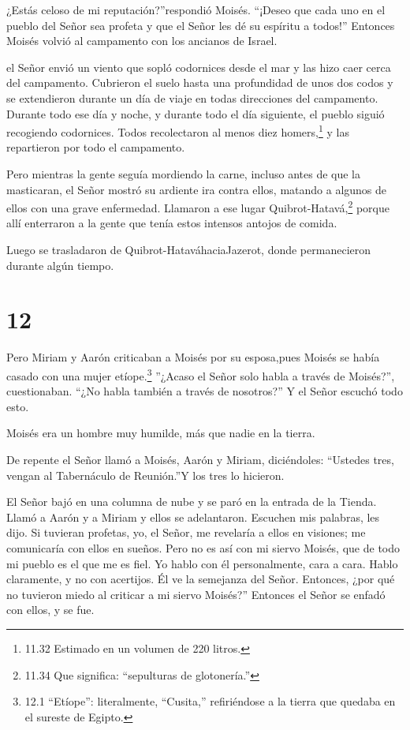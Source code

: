  ¿Estás celoso de mi reputación?''respondió Moisés.
``¡Deseo que cada uno en el pueblo del Señor sea profeta y que el Señor
les dé su espíritu a todos!''  Entonces Moisés volvió al
campamento con los ancianos de Israel.

 el Señor envió un viento que sopló codornices desde el mar
y las hizo caer cerca del campamento. Cubrieron el suelo hasta una
profundidad de unos dos codos y se extendieron durante un día de viaje
en todas direcciones del campamento.  Durante todo ese día
y noche, y durante todo el día siguiente, el pueblo siguió recogiendo
codornices. Todos recolectaron al menos diez homers,\footnote{11.32
  Estimado en un volumen de 220 litros.} y las repartieron por todo el
campamento.

 Pero mientras la gente seguía mordiendo la carne, incluso
antes de que la masticaran, el Señor mostró su ardiente ira contra
ellos, matando a algunos de ellos con una grave enfermedad.
 Llamaron a ese lugar Quibrot-Hatavá,\footnote{11.34 Que
  significa: ``sepulturas de glotonería.''} porque allí enterraron a la
gente que tenía estos intensos antojos de comida.

 Luego se trasladaron de Quibrot-HataváhaciaJazerot, donde
permanecieron durante algún tiempo.

\hypertarget{section-11}{%
\section{12}\label{section-11}}

 Pero Miriam y Aarón criticaban a Moisés por su esposa,pues
Moisés se había casado con una mujer etíope.\footnote{12.1 ``Etíope'':
  literalmente, ``Cusita,'' refiriéndose a la tierra que quedaba en el
  sureste de Egipto.}  ''¿Acaso el Señor solo habla a través
de Moisés?'', cuestionaban. ``¿No habla también a través de nosotros?''
Y el Señor escuchó todo esto.

 Moisés era un hombre muy humilde, más que nadie en la
tierra.

 De repente el Señor llamó a Moisés, Aarón y Miriam,
diciéndoles: ``Ustedes tres, vengan al Tabernáculo de Reunión.''Y los
tres lo hicieron.

 El Señor bajó en una columna de nube y se paró en la
entrada de la Tienda. Llamó a Aarón y a Miriam y ellos se adelantaron.
 Escuchen mis palabras, les dijo. Si tuvieran profetas, yo,
el Señor, me revelaría a ellos en visiones; me comunicaría con ellos en
sueños.  Pero no es así con mi siervo Moisés, que de todo mi
pueblo es el que me es fiel.  Yo hablo con él personalmente,
cara a cara. Hablo claramente, y no con acertijos. Él ve la semejanza
del Señor. Entonces, ¿por qué no tuvieron miedo al criticar a mi siervo
Moisés?''  Entonces el Señor se enfadó con ellos, y se fue.

